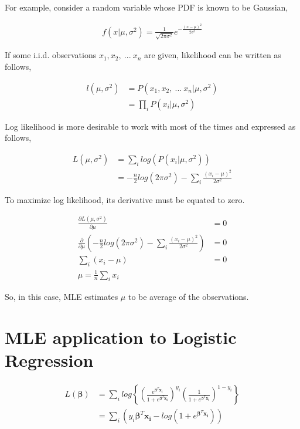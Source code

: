 \documentclass[11pt, a4paper]{article}
\begin{document}
For example, consider a random variable whose PDF is known to be Gaussian,

\begin{align*}
	f(x|\mu, \sigma^2) = \frac{1}{\sqrt{2 \pi \sigma^2}} e^{-\frac{(x-\mu)^2}{2\sigma^2}} 
\end{align*}

If some i.i.d. observations $x_1, x_2, \ ...\ x_n$ are given, likelihood can be written as follows,

\begin{align*}
	l(\mu, \sigma^2) & = P(x_1, x_2,\ ... \ x_n|\mu, \sigma^2) \\
	                 & = \prod_i P(x_i|\mu, \sigma^2)          
\end{align*}

Log likelihood is more desirable to work with most of the times and expressed as follows,

\begin{align*}
	L(\mu, \sigma^2) & = \sum_i log(P(x_i|\mu, \sigma^2))                                        \\
	                 & = -\frac{n}{2} log(2 \pi \sigma^2) - \sum_i \frac{(x_i-\mu)^2}{2\sigma^2} 
\end{align*}

To maximize log likelihood, its derivative must be equated to zero.

\begin{align*}
	\frac{\partial L(\mu, \sigma^2)}{\partial \mu}                                                                    & = 0 \\
	\frac{\partial}{\partial \mu}\left(-\frac{n}{2} log(2 \pi \sigma^2) - \sum_i \frac{(x_i-\mu)^2}{2\sigma^2}\right) & = 0 \\
	\sum_i (x_i - \mu)                                                                                                & = 0 \\
	\mu = \frac{1}{n} \sum_i x_i
\end{align*}

So, in this case, MLE estimates $\mu$ to be average of the observations.

\section{MLE application to Logistic Regression}

\begin{align*}
	L(\boldsymbol{\beta}) & = \sum_i log\left\{ \left(\frac{e^{\boldsymbol{\beta}^T\boldsymbol{x_i}}}{1 + e^{\boldsymbol{\beta}^T\boldsymbol{x_i}}}\right) ^{y_i} \left(\frac{1}{1 + e^{\boldsymbol{\beta}^T\boldsymbol{x_i}}}\right)^{1-y_i}\right\} \\
	                      & = \sum_i \left(y_i \boldsymbol{\beta}^T\boldsymbol{x_i} - log(1 + e^{\boldsymbol{\beta}^T\boldsymbol{x_i}})\right)                                                                                                        
\end{align*}
\end{document}
